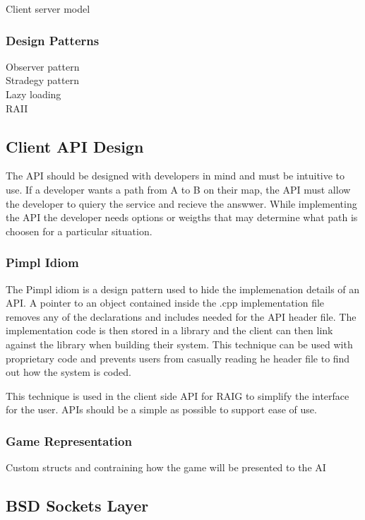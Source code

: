 \documentclass[12pt,a4paper,titlepage]{article}
\begin{document}
Client server model\\

\subsubsection{Design Patterns}
Observer pattern\\
Stradegy pattern\\
Lazy loading\\
RAII\\

\subsection{Client API Design}
\label{section:clientapidesign}

The API should be designed with developers in mind and must be intuitive to use. If a developer wants a path from A to B on their map, the API must allow the developer to quiery the service and recieve the answwer. While implementing the API the developer needs options or weigths that may determine what path is choosen for a particular situation. 

\subsubsection{Pimpl Idiom}

The Pimpl idiom is a design pattern used to hide the implemenation details of an API. A pointer to an object contained inside the .cpp implementation file removes any of the declarations and includes needed for the API header file. The implementation code is then stored in a library and the client can then link against the library when building their system. This technique can be used with proprietary code and prevents users from casually reading he header file to find out how the system is coded. 

This technique is used in the client side API for RAIG to simplify the interface for the user. APIs should be a simple as possible to support ease of use. 

\subsubsection{Game Representation}

Custom structs and contraining how the game will be presented to the AI


\subsection{BSD Sockets Layer}
\label{section:networklayer}
\end{document}
